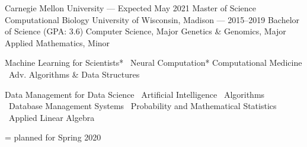 \documentclass[10pt, letterpaper]{awesome-cv}
\begin{document}
\makecvheader
\vspace*{-2mm}
\begin{minipage}[t]{0.5\textwidth}
\begin{cventries}
    \cvgrad
        {Carnegie Mellon University --- \normalsize{Expected May 2021}}
        {Master of Science}
        {Computational Biology}
    \cvundergrad
        {University of Wisconsin, Madison --- \normalsize{2015--2019}}
        {Bachelor of Science (GPA: 3.6)}
        {Computer Science, Major}
        {Genetics \& Genomics, Major}
        {Applied Mathematics, Minor}
\end{cventries}
\end{minipage}
\begin{minipage}[t]{0.5\textwidth}
\newcommand{\sep}{\textbar \ }
\cvsectionline \bodyfont 
{}
Machine Learning for Scientists*
\sep Neural Computation*
 Computational Medicine
\sep Adv. Algorithms \& Data Structures

\vspace*{2em}
Data Management for Data Science 
\sep Artificial Intelligence 
\sep Algorithms 
\sep Database Management Systems 
\sep Probability and Mathematical Statistics
\sep Applied Linear Algebra

\vspace*{0.5em}
\begin{flushright}
    \small * = planned for Spring 2020
\end{flushright}
\vspace*{-2em}
\end{minipage}
\end{document}
